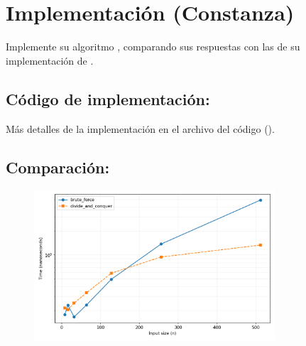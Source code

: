 \documentclass[informe.tex]{subfiles}
\begin{document}
\section{Implementación (Constanza)}

Implemente su algoritmo , comparando sus respuestas con las de su
implementación de .


\subsection{Código de implementación:}


\vspace{1em}

Más detalles de la implementación en el archivo del código ().


\subsection{Comparación:}
\begin{figure}[h] \centering \includegraphics[width=0.8\textwidth]{img/plot_bf_dv.png}
\end{figure}
\end{document}

